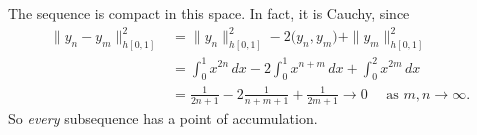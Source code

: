 \documentclass{homework}
\begin{document}
\begin{solution}
  The sequence is compact in this space.  In fact, it is Cauchy, since
  \begin{align*}
    \|y_n - y_m\|_{h[0,1]}^2 
    &= \|y_{n}\|_{h[0,1]}^2 - 2\Big(y_n,y_m\Big) + \|y_m\|_{h[0,1]}^2 \\
    &= \int_0^1 x^{2n}\,dx - 2\int_0^1x^{n+m}\,dx + \int_0^2 x^{2m}\,dx \\
    &= \frac 1{2n+1} - 2\frac 1{n+m+1} + \frac 1{2m+1} \to 0\quad\text{ as }m,n\to \infty.
  \end{align*}
  So \emph{every} subsequence has a point of accumulation.
\end{solution}
\newpage
{}
\end{document}
